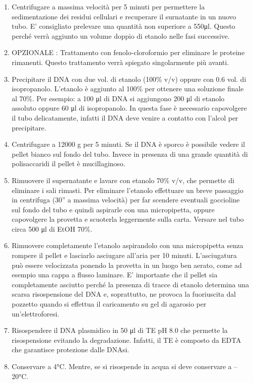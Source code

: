 \begin{enumerate}
  \item Centrifugare a massima velocità per 5 minuti per permettere la sedimentazione dei residui cellulari e recuperare il surnatante in un nuovo tubo. E’ consigliato prelevare una quantità non superiore a 550μl. Questo perché verrà aggiunto un volume doppio di etanolo nelle fasi successive.

  \item OPZIONALE : Trattamento con fenolo-cloroformio per eliminare le proteine rimanenti. Questo trattamento verrà spiegato singolarmente più avanti.

  \item Precipitare il DNA con due vol. di etanolo (100\% v/v) oppure con 0.6 vol. di isopropanolo. L'etanolo è aggiunto al 100\% per ottenere una soluzione finale al 70\%. Per esempio: a 100 μl di DNA si aggiungono 200 μl di etanolo assoluto oppure 60 μl di isopropanolo. In questa fase è necessario capovolgere il tubo delicatamente, infatti il DNA deve venire a contatto con l’alcol per precipitare.

  \item Centrifugare a 12000 g per 5 minuti. Se il DNA è sporco è possibile vedere il pellet bianco sul fondo del tubo. Invece in presenza di una grande quantità di polisaccaridi il pellet è mucillaginoso.

  \item Rimuovere il supernatante e lavare con etanolo 70\% v/v, che permette di eliminare i sali rimasti. Per eliminare l’etanolo effettuare un breve passaggio in centrifuga (30” a massima velocità) per far scendere eventuali goccioline sul fondo del tubo e quindi aspirarle con una micropipetta, oppure capovolgere la provetta e scuoterla leggermente sulla carta. Versare nel tubo circa 500 μl di EtOH 70\%.

  \item Rimuovere completamente l’etanolo aspirandolo con una micropipetta senza rompere il pellet e lasciarlo asciugare all’aria per 10 minuti. L’asciugatura può essere velocizzata ponendo la provetta in un luogo ben aerato, come ad esempio una cappa a flusso laminare. E’ importante che il pellet sia completamente asciutto perché la presenza di tracce di etanolo determina una scarsa risospensione del DNA e, soprattutto, ne provoca la fuoriuscita dal pozzetto quando si effettua il caricamento su gel di agarosio per un’elettroforesi.

  \item Risospendere il DNA plasmidico in 50 μl di TE pH 8.0 che permette la risospensione evitando la degradazione. Infatti, il TE è composto da EDTA che garantisce protezione dalle DNAsi.

  \item Conservare a 4°C. Mentre, se si risospende in acqua si deve conservare a –20°C.

\end{enumerate}

